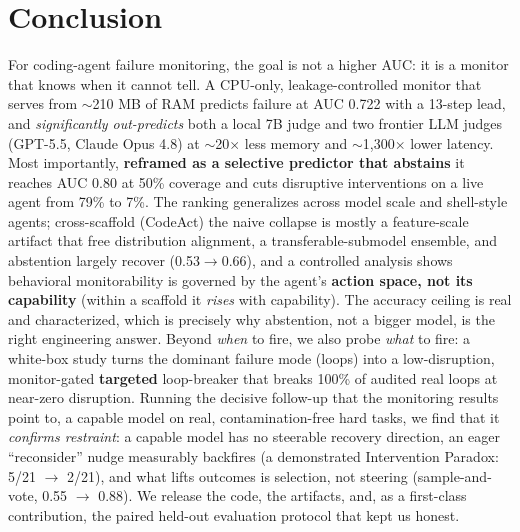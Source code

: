 \section{Conclusion}
For coding-agent failure monitoring, the goal is not a higher AUC: it is a monitor that knows when it cannot tell. A CPU-only, leakage-controlled monitor that serves from $\sim$210 MB of RAM predicts failure at AUC 0.722 with a 13-step lead, and \emph{significantly out-predicts} both a local 7B judge and two frontier LLM judges (GPT-5.5, Claude Opus 4.8) at $\sim$20$\times$ less memory and $\sim$1,300$\times$ lower latency. Most importantly, \textbf{reframed as a selective predictor that abstains} it reaches AUC 0.80 at 50\% coverage and cuts disruptive interventions on a live agent from 79\% to 7\%. The ranking generalizes across model scale and shell-style agents; cross-scaffold (CodeAct) the naive collapse is mostly a feature-scale artifact that free distribution alignment, a transferable-submodel ensemble, and abstention largely recover (0.53$\to$0.66), and a controlled analysis shows behavioral monitorability is governed by the agent's \textbf{action space, not its capability} (within a scaffold it \emph{rises} with capability). The accuracy ceiling is real and characterized, which is precisely why abstention, not a bigger model, is the right engineering answer. Beyond \emph{when} to fire, we also probe \emph{what} to fire: a white-box study turns the dominant failure mode (loops) into a low-disruption, monitor-gated \textbf{targeted} loop-breaker that breaks 100\% of audited real loops at near-zero disruption. Running the decisive follow-up that the monitoring results point to, a capable model on real, contamination-free hard tasks, we find that it \emph{confirms restraint}: a capable model has no steerable recovery direction, an eager ``reconsider'' nudge measurably backfires (a demonstrated Intervention Paradox: 5/21 $\to$ 2/21), and what lifts outcomes is selection, not steering (sample-and-vote, 0.55 $\to$ 0.88). We release the code, the artifacts, and, as a first-class contribution, the paired held-out evaluation protocol that kept us honest.

